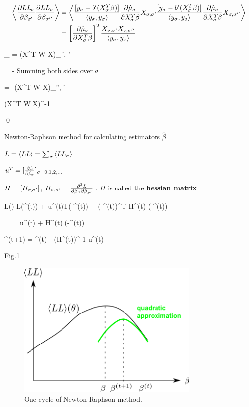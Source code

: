 \begin{align}
\left\langle\frac{\partial LL_\sigma}{\partial\beta_ { \sigma'}}
\frac{\partial LL_\sigma}{\partial\beta_ { \sigma''}} \right\rangle
&=
\left\langle
\frac{[y_\sigma - b'(X_\sigma^T\beta)]}{\left\langle y_\sigma, y_\sigma\right\rangle}
 \frac{\partial\hat{\mu}_\sigma}{\partial X_\sigma^T\beta}
X_{\sigma, \sigma'}
\frac{[y_\sigma - b'(X_\sigma^T\beta)]}{\left\langle y_\sigma, y_\sigma\right\rangle}
 \frac{\partial\hat{\mu}_\sigma}{\partial X_\sigma^T\beta}
X_{\sigma, \sigma''}
\right\rangle
\\
&=
 \left[\frac{\partial\hat{\mu}_\sigma}{\partial X_\sigma^T\beta}\right]^2
\frac{X_{\sigma, \sigma'} X_{\sigma, \sigma''}}{\left\langle y_\sigma, y_\sigma\right\rangle}
\end{align}

\beq
\sum_{\s}
=
(X^T W X)_{\s'', \s'}
\eeq

\beq
{}
=
-
\eeq
Summing both sides over $\sigma$

\beq
{}
=
-(X^T W X)_{\s'', \s'}
\eeq

\beq
{}\rarrow (X^T W X)^{-1}
\eeq

\qed

Newton-Raphson method for calculating
estimators $\hat{\beta}$

$L=\left\langle LL\right\rangle =\sum_\sigma \left\langle LL_\sigma\right\rangle$

$u^T = [\frac{\partial L}{\partial\beta_\sigma}]_{\sigma=0,1,2, \ldots}$

 $H= [H_{\sigma, \sigma'}]$, $H_{\sigma, \sigma'} =
\frac{\partial^2 L }{\partial\beta_\sigma\partial\beta_{\sigma'}}$ .
$H$ is called the {\bf hessian matrix}


\beq
L(\beta)
\approx
L(\beta^{(t)})
+ u^{(t)T}(\beta-\beta^{(t)})
+ 
(\beta-\beta^{(t)})^T H^{(t)} (\beta-\beta^{(t)})
\eeq

 =
=
u^{(t)}
+
H^{(t)} (\beta-\beta^{(t)})
\eeq


\beq
\beta^{(t+1)} =
\beta^{(t)} -  (H^{(t)})^{-1} u^{(t)}
\eeq

Fig.\ref{fig-gml-new-rap}


\begin{figure}[h!]
\centering
\includegraphics[width=3.5in]
{gen-lin-mod/gen-lin-mod.png}
\caption{One cycle of Newton-Raphson method.}
\label{fig-gml-new-rap}
\end{figure}
